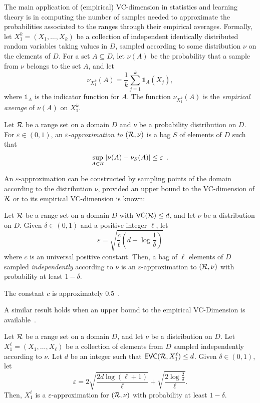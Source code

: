 The main application of (empirical) VC-dimension in statistics and learning
theory is in computing the number of samples needed to approximate the
probabilities associated to the ranges through their empirical averages.
Formally, let $X_1^k=(X_1,\dotsc,X_k)$ be a collection of independent
identically distributed random variables taking values in $D$, sampled 
according to some distribution $\nu$ on the elements of $D$.
For a set $A\subseteq D$, let $\nu(A)$ be the probability that a sample from
$\nu$ belongs to the set $A$, and let
\[
\nu_{X_1^k}(A)=\frac{1}{k}\sum_{j=1}^k\mathds{1}_A(X_j),\]
where $\mathds{1}_A$ is the indicator function for $A$. The function
$\nu_{X_1^k}(A)$ is the \emph{empirical average} of $\nu(A)$ on $X_1^k$.

\begin{definition}\label{def:eapprox}
  Let $\mathcal{R}$ be a range set on a domain
  $D$ and $\nu$ be a probability distribution on $D$. For $\varepsilon\in(0,1)$,
  an \emph{$\varepsilon$-approximation to $(\mathcal{R},\nu)$} is a bag $S$ of
  elements of $D$ such that 
  \[
  \sup_{A\in\mathcal{R}}|\nu(A)-\nu_S(A)|\le\varepsilon\enspace.\]
\end{definition}

An $\varepsilon$-approximation can be constructed by sampling points of
the domain according to the distribution $\nu$, provided an upper bound to the
VC-dimension of $\mathcal{R}$ or to its empirical VC-dimension is known:

\begin{theorem}\label{thm:eapprox}
  Let $\mathcal{R}$ be a range set on a domain 
  $D$ with $\mathsf{VC}(\mathcal{R})\le d$, and let $\nu$ be a distribution on $D$. Given
  $\delta\in(0,1)$ and a positive integer $\ell$, let
  \begin{equation}\label{eq:vceapprox}
    \varepsilon = \sqrt{\frac{c}{\ell}\left(d + \log\frac{1}{\delta}\right)}
  \end{equation}
  where $c$ is an universal positive constant. Then, a bag of $\ell$
  elements of $D$ sampled \emph{independently} according to $\nu$ is an
  $\varepsilon$-approximation to $(\mathcal{R},\nu)$ with probability at least
  $1-\delta$.
\end{theorem}
The constant $c$ is approximately $0.5$~\citep{LofflerP09}.

A similar result holds when an upper bound to the empirical VC-Dimension is
available~\citep{BoucheronBL05}.
\begin{theorem}\label{thm:eapproxempir}
  Let $\mathcal{R}$ be a range set on a domain 
  $D$, and let $\nu$ be a distribution on $D$. Let
  $X_1^\ell=(X_1,\dotsc,X_\ell)$ be a collection of elements from $D$ sampled
  independently according to $\nu$. Let $d$ be an integer such that
  $\mathsf{EVC}(\mathcal{R},X_1^\ell)\le d$.
  Given $\delta\in(0,1)$, let 
  \begin{equation}\label{eq:evceapprox}
    \varepsilon =
    2\sqrt{\frac{2d\log(\ell+1)}{\ell}}+\sqrt{\frac{2\log\frac{2}{\delta}}{\ell}}.
  \end{equation}
   Then, $X_1^\ell$ is a $\varepsilon$-approximation for $(\mathcal{R},\nu)$
   with probability at least $1-\delta$.
 \end{theorem}

